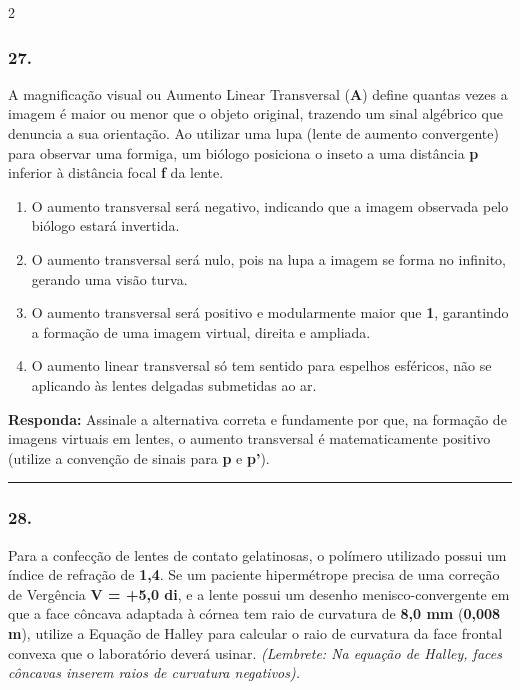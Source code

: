 \documentclass[twoside, 10pt, a4paper]{article}
\newlength{\espacoPreQuestao}\setlength{\espacoPreQuestao}{0.1cm}
\newlength{\espacoQuestao}\setlength{\espacoQuestao}{0.2cm}
\newlength{\espacoAlt}\setlength{\espacoAlt}{0.2cm}
\begin{document}
\begin{multicols*}{2}
\subsubsection*{27.} A magnificação visual ou Aumento Linear Transversal (\textbf{A}) define quantas vezes a imagem é maior ou menor que o objeto original, trazendo um sinal algébrico que denuncia a sua orientação. Ao utilizar uma lupa (lente de aumento convergente) para observar uma formiga, um biólogo posiciona o inseto a uma distância \textbf{p} inferior à distância focal \textbf{f} da lente.
\begin{enumerate}[label=\alph*), itemsep=\espacoAlt]
\item O aumento transversal será negativo, indicando que a imagem observada pelo biólogo estará invertida.
\item O aumento transversal será nulo, pois na lupa a imagem se forma no infinito, gerando uma visão turva.
\item O aumento transversal será positivo e modularmente maior que \textbf{1}, garantindo a formação de uma imagem virtual, direita e ampliada.
\item O aumento linear transversal só tem sentido para espelhos esféricos, não se aplicando às lentes delgadas submetidas ao ar.
\end{enumerate}
\begin{boxresponda}
\textbf{Responda:} Assinale a alternativa correta e fundamente por que, na formação de imagens virtuais em lentes, o aumento transversal é matematicamente positivo (utilize a convenção de sinais para \textbf{p} e \textbf{p'}).
\end{boxresponda}
\par\vspace{\espacoQuestao}

\noindent\textcolor{CorLinha}{\rule{\linewidth}{0.5pt}} 
\par\vspace{\espacoPreQuestao}
\subsubsection*{28.} Para a confecção de lentes de contato gelatinosas, o polímero utilizado possui um índice de refração de \textbf{1,4}. Se um paciente hipermétrope precisa de uma correção de Vergência \textbf{V = +5,0 di}, e a lente possui um desenho menisco-convergente em que a face côncava adaptada à córnea tem raio de curvatura de \textbf{8,0 mm} (\textbf{0,008 m}), utilize a Equação de Halley para calcular o raio de curvatura da face frontal convexa que o laboratório deverá usinar. \textit{(Lembrete: Na equação de Halley, faces côncavas inserem raios de curvatura negativos).}
\par\vspace{\espacoQuestao}


\end{multicols*}
\end{document}
